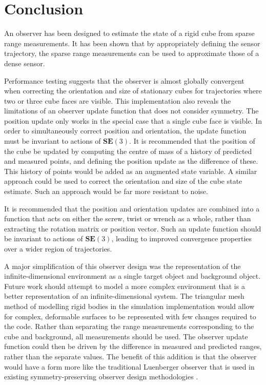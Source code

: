 \chapter*{Conclusion}

An observer has been designed to estimate the state of a rigid cube from sparse range measurements. It has been shown that by appropriately defining the sensor trajectory, the sparse range measurements can be used to approximate those of a dense sensor.

Performance testing suggests that the observer is almost globally convergent when correcting the orientation and size of stationary cubes for trajectories where two or three cube faces are visible. This implementation also reveals the limitations of an observer update function that does not consider symmetry. The position update only works in the special case that a single cube face is visible. In order to simultaneously correct position and orientation, the update function must be invariant to actions of $\mathbf{SE}(3)$.
It is recommended that the position of the cube be updated by computing the centre of mass of a history of predicted and measured points, and defining the position update as the difference of these. This history of points would be added as an augmented state variable. A similar approach could be used to correct the orientation and size of the cube state estimate. Such an approach would be far more resistant to noise.

It is recommended that the position and orientation updates are combined into a function that acts on either the screw, twist or wrench as a whole, rather than extracting the rotation matrix or position vector. Such an update function should be invariant to actions of $\mathbf{SE}(3)$, leading to improved convergence properties over a wider region of trajectories.

A major simplification of this observer design was the representation of the infinite-dimensional environment as a single target object and background object. Future work should attempt to model a more complex environment that is a better representation of an infinite-dimensional system. The triangular mesh method of modelling rigid bodies in the simulation implementation would allow for complex, deformable surfaces to be represented with few changes required to the code. Rather than separating the range measurements corresponding to the cube and background, all measurements should be used. The observer update function could then be driven by the difference in measured and predicted ranges, rather than the separate values. The benefit of this addition is that the observer would have a form more like the traditional Luenberger observer that is used in existing symmetry-preserving observer design methodologies \cite{bonnabel2009non,mahony2013observers}.


